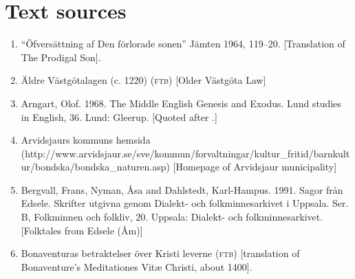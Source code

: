 
\chapter{Text sources}

\begin{enumerate}
\item[\sqbrSenum]  
“Öfversättning af Den förlorade sonen” Jämten 1964, 119--20. [Translation of The Prodigal Son]. 

\item[\sqbrSenum]  
\label{bkm:Ref154219978}Äldre Västgötalagen (c. 1220) (\textsc{ftb}) [Older Västgöta Law]


\item[\sqbrSenum]

\label{bkm:Ref151372879}Arngart, Olof. 1968. The Middle English Genesis and Exodus. Lund studies in English, 36. Lund: Gleerup. [Quoted after \citet{Allen1997}.]

\item[\sqbrSenum]

\label{bkm:Ref137879837}Arvidsjaurs kommuns hemsida (http://www.arvidsjaur.se/sve/kommun/forvaltningar/kultur\_fritid/barnkultur/bondska/bondska\_naturen.asp) [Homepage of Arvidsjaur municipality]


\item[\sqbrSenum]

\label{bkm:Ref150329670}Bergvall, Frans, Nyman, Åsa and Dahlstedt, Karl-Hampus. 1991. Sagor från Edsele. Skrifter utgivna genom Dialekt- och folkminnesarkivet i Uppsala. Ser. B, Folkminnen och folkliv, 20. Uppsala: Dialekt- och folkminnesarkivet. [Folktales from Edsele (Åm)]


\item[\sqbrSenum]

\label{bkm:Ref154213744}Bonaventuras betraktelser över Kristi leverne (\textsc{ftb}) [translation of Bonaventure’s Meditationes Vitæ Christi, about 1400]. 


\end{enumerate}

